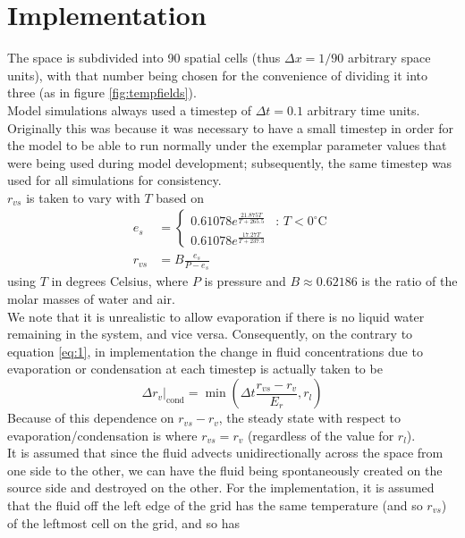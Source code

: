 \documentclass[11pt]{article}
\begin{document}
\section{Implementation}
The space is subdivided into 90 spatial cells (thus $\Delta x=1/90$ arbitrary space units), with that number being chosen for the convenience of dividing it into three (as in figure \ref{fig:tempfields}). \\
Model simulations always used a timestep of $\Delta t=0.1$ arbitrary time units. Originally this was because it was necessary to have a small timestep in order for the model to be able to run normally under the exemplar parameter values that were being used during model development; subsequently, the same timestep was used for all simulations for consistency. \\
$r_{vs}$ is taken to vary with $T$ based on
\begin{align}
e_s &= \begin{cases}
0.61078 e^{\frac{21.875T}{T+265.5}} & \text{: $T<0^{\circ}$C} \\
0.61078 e^{\frac{17.27T}{T+237.3}} &
\end{cases} \label{eq:tetens} \\
r_{vs} &= B\frac{e_s}{P-e_s} \label{eq:magic}
\end{align}
using $T$ in degrees Celsius, where $P$ is pressure and $B\approx0.62186$ is the ratio of the molar masses of water and air. \\
We note that it is unrealistic to allow evaporation if there is no liquid water remaining in the system, and vice versa. Consequently, on the contrary to equation \ref{eq:1}, in implementation the change in fluid concentrations due to evaporation or condensation at each timestep is actually taken to be
\begin{equation} \label{eq:2}
\Delta r_v|_{\text{cond}} = \min\left(\Delta t\frac{r_{vs} - r_v}{E_r},r_l\right)
\end{equation}
Because of this dependence on $r_{vs}-r_v$, the steady state with respect to evaporation/condensation is where $r_{vs}=r_v$ (regardless of the value for $r_l$). \\
It is assumed that since the fluid advects unidirectionally across the space from one side to the other, we can have the fluid being spontaneously created on the source side and destroyed on the other. For the implementation, it is assumed that the fluid off the left edge of the grid has the same temperature (and so $r_{vs}$) of the leftmost cell on the grid, and so has
\end{document}
